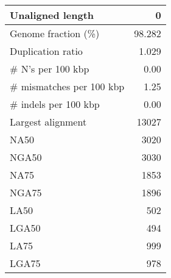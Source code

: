 \documentclass[12pt,a4paper]{article}
\begin{document}
\begin{table}[ht]
\begin{center}
\begin{tabular}{|l*{1}{|r}|}
Unaligned length & 0 \\ \hline
Genome fraction (\%) & 98.282 \\ \hline
Duplication ratio & 1.029 \\ \hline
\# N's per 100 kbp & 0.00 \\ \hline
\# mismatches per 100 kbp & 1.25 \\ \hline
\# indels per 100 kbp & 0.00 \\ \hline
Largest alignment & 13027 \\ \hline
NA50 & 3020 \\ \hline
NGA50 & 3030 \\ \hline
NA75 & 1853 \\ \hline
NGA75 & 1896 \\ \hline
LA50 & 502 \\ \hline
LGA50 & 494 \\ \hline
LA75 & 999 \\ \hline
LGA75 & 978 \\ \hline
\end{tabular}
\end{center}
\end{table}
\end{document}
